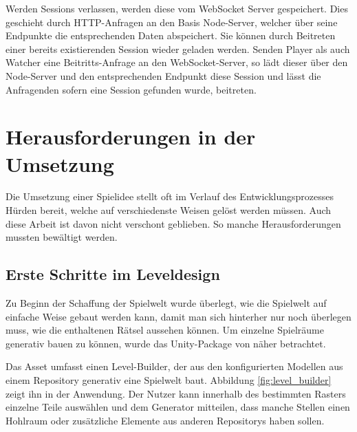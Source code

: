 Werden Sessions verlassen, werden diese vom WebSocket Server gespeichert. Dies geschieht durch \ac{HTTP}-Anfragen an den Basis Node-Server, welcher über seine Endpunkte die entsprechenden Daten abspeichert. Sie können durch Beitreten einer bereits existierenden Session wieder geladen werden. Senden Player als auch Watcher eine Beitritts-Anfrage an den WebSocket-Server, so lädt dieser über den Node-Server und den entsprechenden Endpunkt diese Session und lässt die Anfragenden sofern eine Session gefunden wurde, beitreten.


\section{Herausforderungen in der Umsetzung}\label{sec:difficulties}
Die Umsetzung einer Spielidee stellt oft im Verlauf des Entwicklungsprozesses Hürden bereit, welche auf verschiedenste Weisen gelöst werden müssen. Auch diese Arbeit ist davon nicht verschont geblieben. So manche Herausforderungen mussten bewältigt werden.

\subsection{Erste Schritte im Leveldesign}
Zu Beginn der Schaffung der Spielwelt wurde überlegt, wie die Spielwelt auf einfache Weise gebaut werden kann, damit man sich hinterher nur noch überlegen muss, wie die enthaltenen Rätsel aussehen können. Um einzelne Spielräume generativ bauen zu können, wurde das Unity-Package von \cite{alasl_autolevel_nodate} näher betrachtet.

Das Asset umfasst einen Level-Builder, der aus den konfigurierten Modellen aus einem Repository generativ eine Spielwelt baut. Abbildung \ref{fig:level_builder} zeigt ihn in der Anwendung. Der Nutzer kann innerhalb des bestimmten Rasters einzelne Teile auswählen und dem Generator mitteilen, dass manche Stellen einen Hohlraum oder zusätzliche Elemente aus anderen Repositorys haben sollen.

